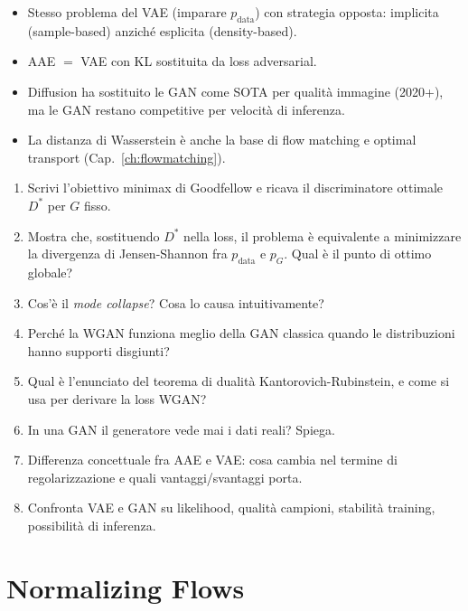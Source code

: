 \begin{tcolorbox}[mybox, title={Connessioni}]
\begin{itemize}
  \item Stesso problema del VAE (imparare $p_{\text{data}}$) con strategia opposta: implicita (sample-based) anziché esplicita (density-based).
  \item AAE $=$ VAE con KL sostituita da loss adversarial.
  \item Diffusion ha sostituito le GAN come SOTA per qualità immagine (2020+), ma le GAN restano competitive per velocità di inferenza.
  \item La distanza di Wasserstein è anche la base di flow matching e optimal transport (Cap.~\ref{ch:flowmatching}).
\end{itemize}
\end{tcolorbox}

\begin{tcolorbox}[mywarn, title={Domande d'esame — GAN}]
\begin{enumerate}
  \item Scrivi l'obiettivo minimax di Goodfellow e ricava il discriminatore ottimale $D^*$ per $G$ fisso.
  \item Mostra che, sostituendo $D^*$ nella loss, il problema è equivalente a minimizzare la divergenza di Jensen-Shannon fra $p_{\text{data}}$ e $p_G$. Qual è il punto di ottimo globale?
  \item Cos'è il \emph{mode collapse}? Cosa lo causa intuitivamente?
  \item Perché la WGAN funziona meglio della GAN classica quando le distribuzioni hanno supporti disgiunti?
  \item Qual è l'enunciato del teorema di dualità Kantorovich-Rubinstein, e come si usa per derivare la loss WGAN?
  \item In una GAN il generatore vede mai i dati reali? Spiega.
  \item Differenza concettuale fra AAE e VAE: cosa cambia nel termine di regolarizzazione e quali vantaggi/svantaggi porta.
  \item Confronta VAE e GAN su likelihood, qualità campioni, stabilità training, possibilità di inferenza.
\end{enumerate}
\end{tcolorbox}

\chapter{Normalizing Flows}
\label{ch:flows}

